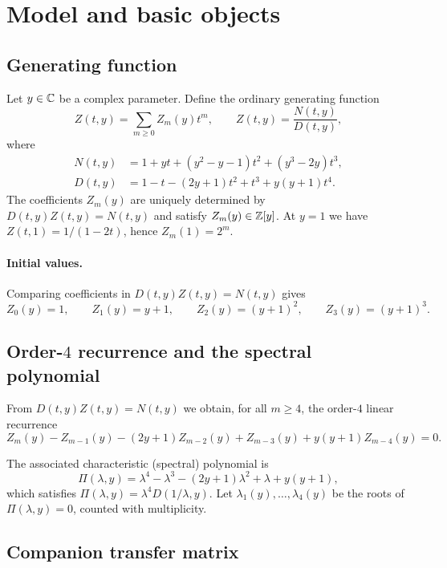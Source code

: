 \section{Model and basic objects}\label{sec:model}

\subsection{Generating function}
\label{subsec:ogf}

Let \(y\in\mathbb{C}\) be a complex parameter. Define the ordinary generating function
\[
Z(t,y)=\sum_{m\ge 0} Z_m(y)t^m,
\qquad
Z(t,y)=\frac{N(t,y)}{D(t,y)},
\]
where
\begin{align*}
N(t,y) &= 1+yt+(y^2-y-1)t^2+(y^3-2y)t^3,\\
D(t,y) &= 1-t-(2y+1)t^2+t^3+y(y+1)t^4.
\end{align*}
The coefficients \(Z_m(y)\) are uniquely determined by \(D(t,y)Z(t,y)=N(t,y)\) and satisfy \(Z_m(y)\in\mathbb{Z}[y]\).
At \(y=1\) we have \(Z(t,1)=1/(1-2t)\), hence \(Z_m(1)=2^m\).

\paragraph{Initial values.}
Comparing coefficients in \(D(t,y)Z(t,y)=N(t,y)\) gives
\[
Z_0(y)=1,\qquad Z_1(y)=y+1,\qquad Z_2(y)=(y+1)^2,\qquad Z_3(y)=(y+1)^3.
\]

\subsection{Order-\texorpdfstring{\(4\)}{4} recurrence and the spectral polynomial}
\label{subsec:recurrence}

From \(D(t,y)Z(t,y)=N(t,y)\) we obtain, for all \(m\ge 4\), the order-\(4\) linear recurrence
\begin{equation}\label{eq:recurrence}
Z_m(y)-Z_{m-1}(y)-(2y+1)Z_{m-2}(y)+Z_{m-3}(y)+y(y+1)Z_{m-4}(y)=0.
\end{equation}

The associated characteristic (spectral) polynomial is
\begin{equation}\label{eq:spectral-poly}
\Pi(\lambda,y)=\lambda^4-\lambda^3-(2y+1)\lambda^2+\lambda+y(y+1),
\end{equation}
which satisfies \(\Pi(\lambda,y)=\lambda^4 D(1/\lambda,y)\).
Let \(\lambda_1(y),\dots,\lambda_4(y)\) be the roots of \(\Pi(\lambda,y)=0\), counted with multiplicity.

\subsection{Companion transfer matrix}
\label{subsec:transfer-matrix}

